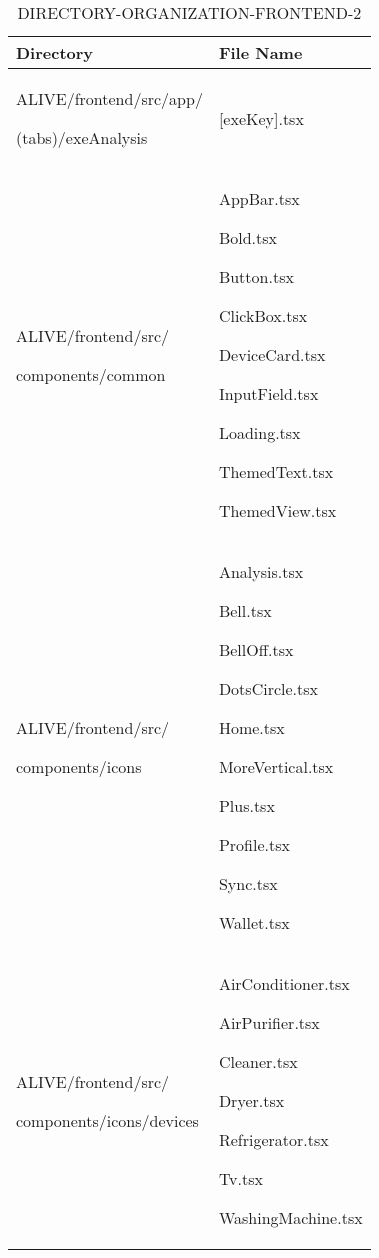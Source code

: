 \documentclass[conference]{IEEEtran}
\begin{document}
\begin{table}[h]
\caption{DIRECTORY-ORGANIZATION-FRONTEND-2}
\def\arraystretch{1.24} \small
    \begin{tabular}{|p{3.7cm}|p{4.1cm}|}
\hline
        Directory & File Name \\ \hline
          ALIVE/frontend/src/app/ \par (tabs)/exeAnalysis \par  & [exeKey].tsx
          \\ \hline
          
          ALIVE/frontend/src/ \par components/common \par  & AppBar.tsx \par Bold.tsx \par Button.tsx \par ClickBox.tsx \par DeviceCard.tsx \par InputField.tsx \par Loading.tsx \par ThemedText.tsx \par ThemedView.tsx
          \\ \hline
          
          ALIVE/frontend/src/ \par components/icons \par  & Analysis.tsx \par Bell.tsx \par BellOff.tsx \par DotsCircle.tsx \par Home.tsx \par MoreVertical.tsx \par Plus.tsx \par Profile.tsx \par Sync.tsx \par Wallet.tsx
          \\ \hline
          
          ALIVE/frontend/src/ \par components/icons/devices \par  & AirConditioner.tsx \par AirPurifier.tsx \par Cleaner.tsx \par Dryer.tsx \par Refrigerator.tsx \par Tv.tsx \par WashingMachine.tsx
          \\ \hline
          

\end{tabular}
\end{table}
\end{document}
